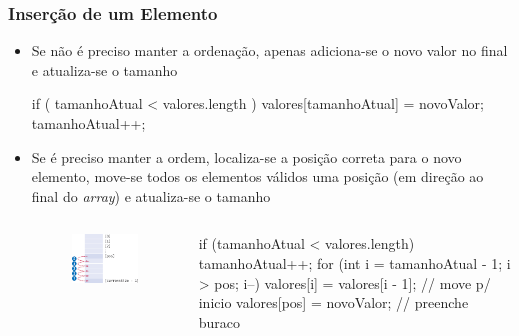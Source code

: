 \documentclass[xcolor={dvipsnames,table},aspectratio=169]{beamer}
\begin{document}
\begin{frame}[fragile]\frametitle{Inserção de um Elemento}
\begin{itemize}
	\item Se não é preciso manter a ordenação, apenas adiciona-se o novo valor no final e atualiza-se o tamanho
{\tiny
\begin{javacode}
if ( tamanhoAtual < valores.length ) {
   valores[tamanhoAtual] = novoValor;
   tamanhoAtual++;
}
\end{javacode}
}
	\item Se é preciso manter a ordem, localiza-se a posição correta para o novo elemento, move-se todos os elementos válidos uma posição (em direção ao final do \emph{array}) e atualiza-se o tamanho
\begin{columns}[T]
	\begin{column}{0.35\linewidth}
\begin{figure}[h]
	\includegraphics[height=0.30\paperheight,center]{pucrs-ep-fprog-unidade_06-arrays-laminas-insercao.png}
\end{figure}
	\end{column}
	\begin{column}{0.65\linewidth}
{\scriptsize
\begin{javacode}
if (tamanhoAtual < valores.length) {
   tamanhoAtual++;
   for (int i = tamanhoAtual - 1; i > pos; i--) {
     valores[i] = valores[i - 1];  // move p/ inicio
   }
   valores[pos] = novoValor;     // preenche buraco
}
\end{javacode}
}
	\end{column}
\end{columns}
\end{itemize}
\end{frame}
\end{document}
